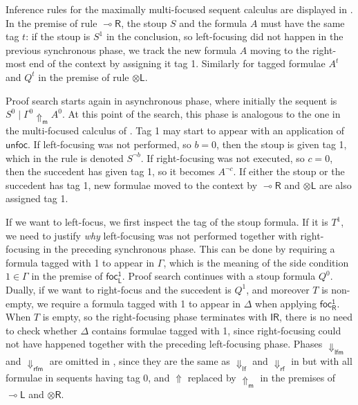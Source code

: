 \documentclass[runningheads]{llncs}
\newcommand{\tl}{\otimes \mathsf{L}}
\newcommand{\tr}{\otimes \mathsf{R}}
\newcommand{\lright}{{\multimap}\mathsf{R}}
\newcommand{\lleft}{{\multimap}\mathsf{L}}
\newcommand{\pass}{\mathsf{pass}}
\newcommand{\unitr}{\mathsf{IR}}
\newcommand{\otL}{\tl}
\newcommand{\otR}{\tr}
\newcommand{\lolliR}{\lright}
\newcommand{\lolliL}{\lleft}
\newcommand{\IR}{\unitr}
\newcommand{\lfm}{\dn_\mathsf{lfm}}%
\newcommand{\rfm}{\dn_\mathsf{rfm}}%
\newcommand{\lf}{\dn_\mathsf{lf}}%
\newcommand{\rf}{\dn_\mathsf{rf}}%
\newcommand{\red}[1]{{#1^1}}
\newcommand{\green}[1]{{#1^0}}
\newcommand{\up}{\Uparrow}
\newcommand{\dn}{\Downarrow}
\newcommand{\upm}{\Uparrow_{\mathsf{m}}}
\newcommand{\focLred}{\mathsf{foc_L^1}}
\newcommand{\focRred}{\mathsf{foc_R^1}}
\newcommand{\unfoc}{\mathsf{unfoc}}
\begin{document}
Inference rules for the maximally multi-focused sequent calculus are displayed in . In the premise of rule $\lolliR$, the stoup $S$ and the formula $A$ must have the same tag $t$: if the stoup is $S^1$ in the conclusion, so left-focusing did not happen in the previous synchronous phase, we track the new formula $A$ moving to the right-most end of the context by assigning it tag 1.
Similarly for tagged formulae $A^t$ and $Q^t$ in the premise of rule $\otL$.

Proof search starts again in asynchronous phase, where initially the sequent is $\green{S} \mid \green{\Gamma} \upm \green{A}$. At this point of the search, this phase is analogous to the one in the multi-focused calculus of . Tag 1 may start to appear with an application of $\unfoc$. If left-focusing was not performed, so $b = 0$, then the stoup is given tag 1, which in the rule is denoted $S^{\neg b}$. If right-focusing was not executed, so $c = 0$, then the succedent has given tag 1, so it becomes  $A^{\neg c}$. If either the stoup or the succedent has tag 1, new formulae moved to the context by $\lolliR$ and $\otL$ are also assigned tag 1.

If we want to left-focus, we first inspect the tag of the stoup formula. If it is $T^1$, we need to justify \emph{why} left-focusing was not performed together with right-focusing in the preceding synchronous phase. This can be done by requiring a formula tagged with 1 to appear in $\Gamma$, which is the meaning of the side condition $1 \in \Gamma$ in the premise of $\focLred$. Proof search continues with a stoup formula $\green{Q}$. Dually, if we want to right-focus and the succedent is $Q^1$, and moreover $T$ is non-empty, we require a formula tagged with 1 to appear in $\Delta$ when applying $\focRred$. When $T$ is empty, so the right-focusing phase terminates with $\IR$, there is no need to check whether $\Delta$ contains formulae tagged with 1, since right-focusing could not have happened together with the preceding left-focusing phase. Phases $\lfm$ and $\rfm$ are omitted in , since they are the same as $\lf$ and $\rf$ in  but with all formulae in sequents having tag 0, and $\up$ replaced by $\upm$ in the premises of $\lolliL$ and $\otR$.

\end{document}
